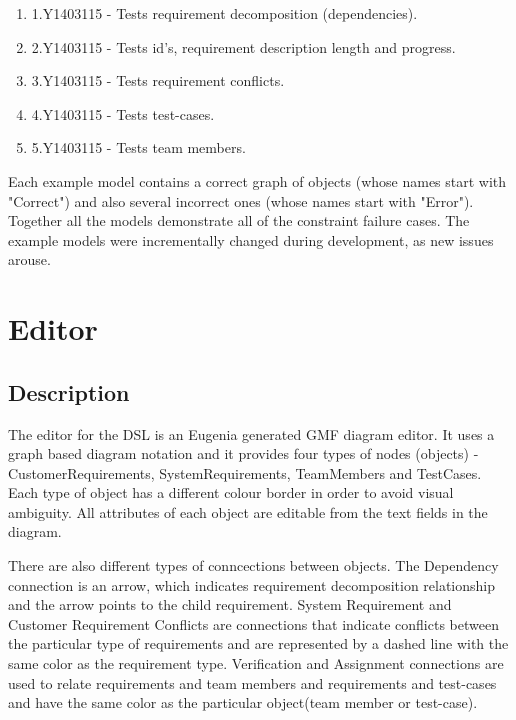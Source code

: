 \documentclass[11pt,a4paper]{article}
\begin{document}
	\begin{enumerate}[noitemsep]
		\item 1.Y1403115 - Tests requirement decomposition (dependencies).
		\item 2.Y1403115 - Tests id's, requirement description length and progress.
		\item 3.Y1403115 - Tests requirement conflicts.
		\item 4.Y1403115 - Tests test-cases.
		\item 5.Y1403115 - Tests team members.
	\end{enumerate}
	
	Each example model contains a correct graph of objects (whose names start with "Correct") and also several incorrect ones (whose names start with "Error"). Together all the models demonstrate all of the constraint failure cases. The example models were incrementally changed during development, as new issues arouse. 
	
	

	\section{Editor}
	
	\subsection{Description}
	The editor for the DSL is an Eugenia \cite{eugenia} generated GMF \cite{gmf} diagram editor. It uses a graph based diagram notation and it provides four types of nodes (objects) - CustomerRequirements, SystemRequirements, TeamMembers and TestCases. Each type of object has a different colour border in order to avoid visual ambiguity. All attributes of each object are editable from the text fields in the diagram.
	
	There are also different types of conncections between objects. The Dependency connection is an arrow, which indicates requirement decomposition relationship and the arrow points to the child requirement. System Requirement and Customer Requirement Conflicts are connections that indicate conflicts between the particular type of requirements and are represented by a dashed line with the same color as the requirement type. Verification and Assignment connections are used to relate requirements and team members and requirements and test-cases and have the same color as the particular object(team member or test-case).
	
\end{document}

